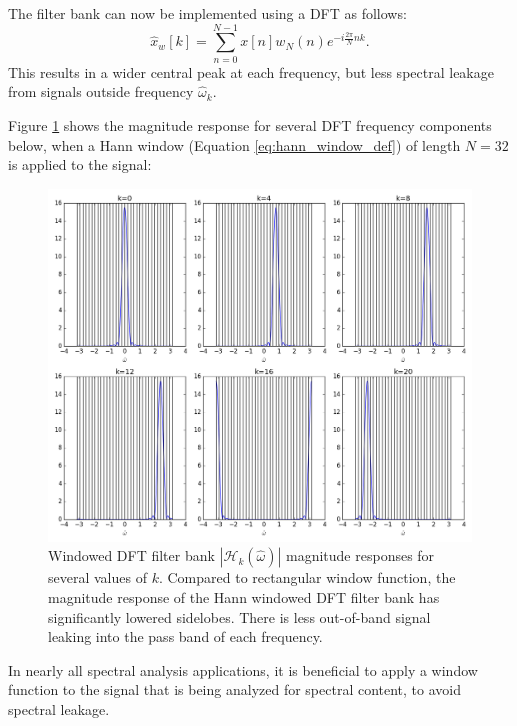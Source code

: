 The filter bank can now be implemented using a DFT as follows:
\begin{equation}
    \boxed{
    \hat{x}_w[k] = \sum_{n=0}^{N-1}x[n]w_N(n)e^{-i\frac{2\pi}{N}nk}.
    }
    \label{wdft}
\end{equation}
This results in a wider central peak at each frequency, but less
spectral leakage from signals outside frequency $\hat{\omega}_k$.

Figure \ref{fig:windowed_dft} shows the magnitude response
for several DFT frequency components below, when a Hann window
(Equation \ref{eq:hann_window_def}) of length $N=32$ is applied to the
signal:
\begin{figure}
    \begin{center}
        \includegraphics[width=\textwidth]{ch16/figures/fft_freqresp_w.png}
    \end{center}
    \caption{Windowed DFT filter bank $|\mathcal{H}_k(\hat{\omega})|$ magnitude responses for several values of $k$.
        Compared to rectangular window function, the magnitude response of the
        Hann windowed DFT filter bank has significantly lowered sidelobes.
        There is less out-of-band signal leaking into the pass band of each frequency.}
    \label{fig:windowed_dft}
\end{figure}

In nearly all spectral analysis applications, it is beneficial to
apply a window function to the signal that is being analyzed for
spectral content, to avoid spectral leakage.

